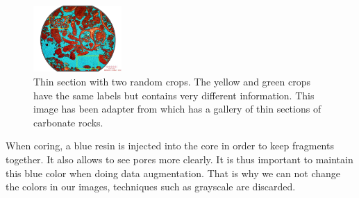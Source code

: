 \begin{figure}[h]
    \centering
        \includegraphics[width=0.3\textwidth]{./figures/03-cropping_example_with2crops}
        \caption[Thin section with 2 random crops]{ Thin section with two random crops. The yellow and green crops have the same labels but contains very different information. This image has been adapter from \cite{section} which has a gallery of thin sections of carbonate rocks. }
        \label{fig:crops}
\end{figure}

When coring, a blue resin is injected into the core in order to keep fragments together. It also allows to see pores more clearly. It is thus important to maintain this blue color when doing data augmentation. That is why we can not change the colors in our images, techniques such as grayscale are discarded.


